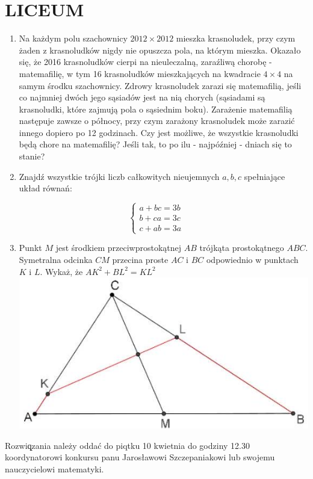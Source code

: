 \documentclass[10pt]{article}
\begin{document}
\section*{LICEUM}
\begin{enumerate}
  \item Na każdym polu szachownicy \(2012 \times 2012\) mieszka krasnoludek, przy czym żaden z krasnoludków nigdy nie opuszcza pola, na którym mieszka. Okazało się, że 2016 krasnoludków cierpi na nieuleczalną, zaraźliwą chorobę - matemafilię, w tym 16 krasnoludków mieszkających na kwadracie \(4 \times 4\) na samym środku szachownicy. Zdrowy krasnoludek zarazi się matemafilią, jeśli co najmniej dwóch jego sąsiadów jest na nią chorych (sąsiadami są krasnoludki, które zajmują pola o sąsiednim boku). Zarażenie matemafilią następuje zawsze o północy, przy czym zarażony krasnoludek może zarazić innego dopiero po 12 godzinach. Czy jest możliwe, że wszystkie krasnoludki będą chore na matemafilię? Jeśli tak, to po ilu - najpóźniej - dniach się to stanie?
  \item Znajdź wszystkie trójki liczb całkowitych nieujemnych \(a, b, c\) spełniające układ równań:
\end{enumerate}

\[
\left\{\begin{array}{l}
a+b c=3 b \\
b+c a=3 c \\
c+a b=3 a
\end{array}\right.
\]

\begin{enumerate}
  \setcounter{enumi}{2}
  \item Punkt \(M\) jest środkiem przeciwprostokątnej \(A B\) trójkąta prostokątnego \(A B C\). Symetralna odcinka \(C M\) przecina proste \(A C\) i \(B C\) odpowiednio w punktach \(K\) i \(L\). Wykaż, że \(A K^{2}+B L^{2}=K L^{2}\)\\
\includegraphics[max width=\textwidth, center]{2024_11_21_c99ffd375c316295e466g-1(1)}
\end{enumerate}

Rozwiq̨zania należy oddać do piqtku 10 kwietnia do godziny 12.30 koordynatorowi konkursu panu Jarosławowi Szczepaniakowi lub swojemu nauczycielowi matematyki.
\end{document}
